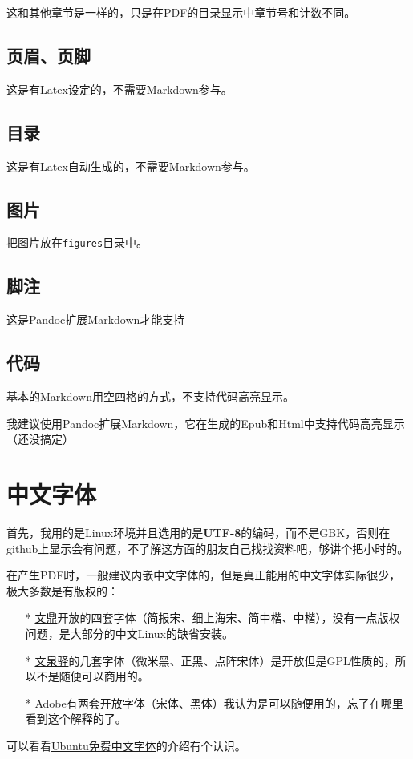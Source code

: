 \documentclass[a4paper]{book}
\begin{document}
这和其他章节是一样的，只是在PDF的目录显示中章节号和计数不同。

\subsection{页眉、页脚}

这是有Latex设定的，不需要Markdown参与。

\subsection{目录}

这是有Latex自动生成的，不需要Markdown参与。

\subsection{图片}

把图片放在{\texttt{figures}}目录中。

\subsection{脚注}

这是Pandoc扩展Markdown才能支持

\subsection{代码}

基本的Markdown用空四格的方式，不支持代码高亮显示。

我建议使用Pandoc扩展Markdown，它在生成的Epub和Html中支持代码高亮显示（还没搞定）

\section{中文字体}

首先，我用的是Linux环境并且选用的是\textbf{UTF-8}的编码，而不是GBK，否则在github上显示会有问题，不了解这方面的朋友自己找找资料吧，够讲个把小时的。

在产生PDF时，一般建议内嵌中文字体的，但是真正能用的中文字体实际很少，极大多数是有版权的：

\begin{itemize}\setlength{\itemsep}{1pt}\setlength{\parskip}{0pt}\setlength{\parsep}{0pt}
\item[*]
  \href{http://www.arphic.com.tw/}{文鼎}开放的四套字体（简报宋、细上海宋、简中楷、中楷），没有一点版权问题，是大部分的中文Linux的缺省安装。
\item[*]
  \href{http://wenq.org/}{文泉驿}的几套字体（微米黑、正黑、点阵宋体）是开放但是GPL性质的，所以不是随便可以商用的。
\item[*]
  Adobe有两套开放字体（宋体、黑体）我认为是可以随便用的，忘了在哪里看到这个解释的了。
\end{itemize}
可以看看\href{http://wiki.ubuntu.org.cn/\%E5\%85\%8D\%E8\%B4\%B9\%E4\%B8\%AD\%E6\%96\%87\%E5\%AD\%97\%E4\%BD\%93}{Ubuntu免费中文字体}的介绍有个认识。
\end{document}
